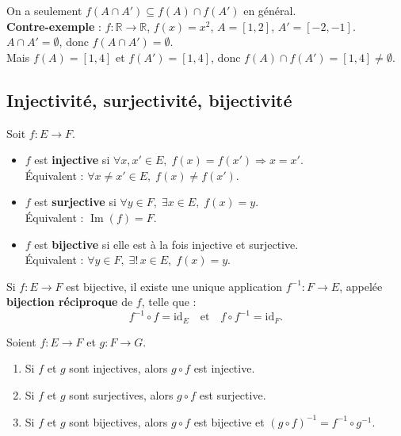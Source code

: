 \documentclass[11pt,a4paper,twoside]{book}
\newcommand{\R}{\mathbb{R}}
\DeclareMathOperator{\Im}{Im}
\begin{document}
\begin{erreurbox}
On a seulement $f(A \cap A') \subseteq f(A) \cap f(A')$ en général.\\
\textbf{Contre-exemple} : $f : \R \to \R$, $f(x) = x^2$, $A = [1,2]$, $A' = [-2,-1]$.\\
$A \cap A' = \emptyset$, donc $f(A \cap A') = \emptyset$.\\
Mais $f(A) = [1,4]$ et $f(A') = [1,4]$, donc $f(A) \cap f(A') = [1,4] \neq \emptyset$.
\end{erreurbox}

\subsection{Injectivité, surjectivité, bijectivité}

\begin{definitionbox}
Soit $f : E \to F$.
\begin{itemize}
  \item $f$ est \textbf{injective} si $\forall x, x' \in E,\; f(x) = f(x') \Rightarrow x = x'$.\\
        Équivalent : $\forall x \neq x' \in E,\; f(x) \neq f(x')$.
  \item $f$ est \textbf{surjective} si $\forall y \in F,\; \exists x \in E,\; f(x) = y$.\\
        Équivalent : $\Im(f) = F$.
  \item $f$ est \textbf{bijective} si elle est à la fois injective et surjective.\\
        Équivalent : $\forall y \in F,\; \exists!\, x \in E,\; f(x) = y$.
\end{itemize}
\end{definitionbox}

\begin{theoremebox}
Si $f : E \to F$ est bijective, il existe une unique application $f^{-1} : F \to E$,
appelée \textbf{bijection réciproque} de $f$, telle que :
\[
  f^{-1} \circ f = \mathrm{id}_E \quad \text{et} \quad f \circ f^{-1} = \mathrm{id}_F.
\]
\end{theoremebox}

\begin{propositionbox}
Soient $f : E \to F$ et $g : F \to G$.
\begin{enumerate}
  \item Si $f$ et $g$ sont injectives, alors $g \circ f$ est injective.
  \item Si $f$ et $g$ sont surjectives, alors $g \circ f$ est surjective.
  \item Si $f$ et $g$ sont bijectives, alors $g \circ f$ est bijective et
        $(g \circ f)^{-1} = f^{-1} \circ g^{-1}$.
\end{enumerate}
\end{propositionbox}
\end{document}
